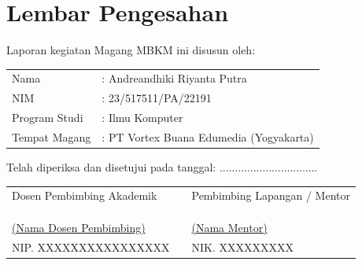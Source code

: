 \chapter*{Lembar Pengesahan}

\noindent Laporan kegiatan Magang MBKM ini disusun oleh:
\vspace{0.5cm}

\begin{tabular}{ll}
Nama & : Andreandhiki Riyanta Putra \\
NIM & : 23/517511/PA/22191 \\
Program Studi & : Ilmu Komputer \\
Tempat Magang & : PT Vortex Buana Edumedia (Yogyakarta) \\
\end{tabular}

\vspace{1cm}
\noindent Telah diperiksa dan disetujui pada tanggal: ................................

\vspace{2cm}
\begin{center}
\small
\begin{tabular}{@{}>{\centering\arraybackslash}p{}p{}>{\centering\arraybackslash}p{}@{}}
    Dosen Pembimbing Akademik & & Pembimbing Lapangan / Mentor \\
    & & \\
    & & \\
    & & \\
    \underline{(Nama Dosen Pembimbing)} & & \underline{(Nama Mentor)} \\
    NIP. XXXXXXXXXXXXXXXX & & NIK. XXXXXXXXX \\
\end{tabular}
\normalsize
\end{center}